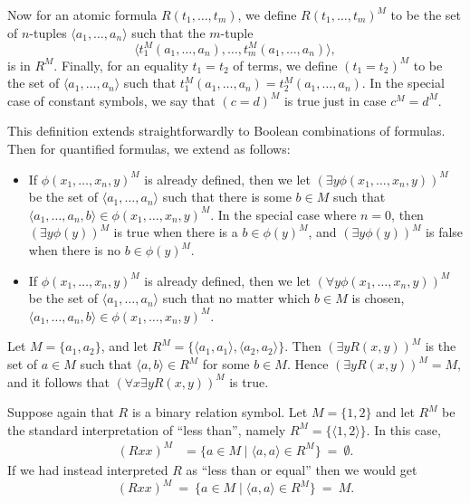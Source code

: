 Now for an atomic formula $R(t_1,\dots ,t_m)$, we define
$R(t_1,\dots ,t_m)^M$ to be the set of $n$-tuples
$\langle a_1,\dots ,a_n\rangle$ such that the $m$-tuple
\[ \langle t_1^M(a_1,\dots ,a_n),\dots ,t_m^M(a_1,\dots ,a_n)\rangle
  ,\] is in $R^M$.  Finally, for an equality $t_1=t_2$ of terms, we
define \mbox{$(t_1=t_2)^M$} to be the set of
$\langle a_1,\dots ,a_n\rangle$ such that
$t_1^M(a_1,\dots ,a_n)=t_2^M(a_1,\dots ,a_n)$.  In the special case of
constant symbols, we say that $(c=d)^M$ is true just in case
$c^M=d^M$.
 
This definition extends straightforwardly to Boolean combinations of
formulas.  Then for quantified formulas, we extend as follows:
 \begin{itemize}
 \item If $\phi (x_1,\dots ,x_n,y)^M$ is already defined, then we let
   $(\exists y\phi (x_1,\dots ,x_n,y))^M$ be the set of
   $\langle a_1,\dots ,a_n\rangle$ such that there is some $b\in M$
   such that
   $\langle a_1,\dots ,a_n,b\rangle\in \phi (x_1,\dots ,x_n,y)^M$.  In
   the special case where $n=0$, then $(\exists y\phi (y))^M$ is true
   when there is a $b\in \phi (y)^M$, and $(\exists y\phi (y))^M$ is
   false when there is no $b\in \phi (y)^M$.
 \item If $\phi (x_1,\dots ,x_n,y)^M$ is already defined, then we let
   $(\forall y\phi (x_1,\dots ,x_n,y))^M$ be the set of
   $\langle a_1,\dots ,a_n\rangle$ such that no matter which $b\in M$
   is chosen,
   $\langle a_1,\dots ,a_n,b\rangle\in \phi (x_1,\dots
   ,x_n,y)^M$. \end{itemize}

 \begin{example} Let $M=\{ a_1,a_2\}$, and let
   $R^M=\{ \langle a_1,a_1\rangle ,\langle a_2,a_2\rangle \}$.  Then
   $(\exists yR(x,y))^M$ is the set of $a\in M$ such that
   $\langle a,b\rangle \in R^M$ for some $b\in M$.  Hence
   $(\exists yR(x,y))^M=M$, and it follows that
   $(\forall x\exists yR(x,y))^M$ is true.
\end{example}

\begin{example} Suppose again that $R$ is a binary relation symbol.  
  Let $M=\{ 1,2\}$ and let $R^M$ be the
standard interpretation of ``less than'', namely
$R^M=\{ \langle 1,2\rangle \}$.  In this case,
\[ \begin{aligned}
    (Rxx)^M & = \{ a\in M \mid \langle a,a\rangle \in R^M \} \: = \:
    \emptyset . \end{aligned} \] If we had instead interpreted
$R$ as ``less than or equal'' then we would get
\[ (Rxx)^M \: = \: \{ a\in M \mid \langle a,a\rangle \in R^M \} \: =
  \: M .\] \end{example}

